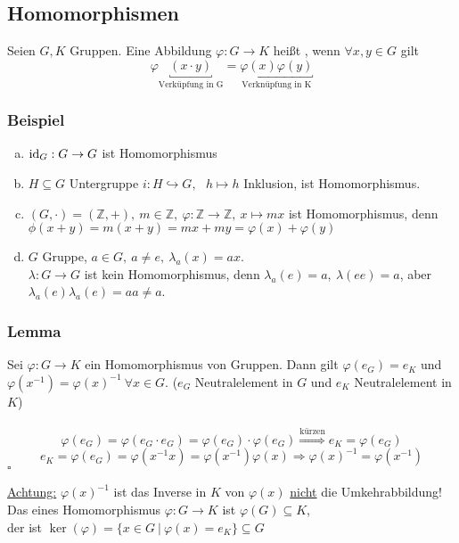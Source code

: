 \subsection{Homomorphismen}
\label{sub:homomorphismen}
Seien $G,K$ Gruppen. 
Eine Abbildung $\varphi: G \to K$ heißt , wenn $\forall x,y \in G$ gilt
\[
\varphi\underbracket{(x\cdot y)}_{\text{Verküpfung in G} } =\underbracket{\varphi(x)\varphi(y)}_{\text{Verknüpfung in K}} 
\]

\subsubsection*{Beispiel}
\begin{enumerate}[(a)]
	\item $\operatorname{id}_G: G \to G$ ist Homomorphismus
	\item $H \subseteq G$ Untergruppe   $i:H \hookrightarrow G,~~~h \mapsto h$ Inklusion, ist Homomorphismus.
	\item $(G,\cdot)=(\mathds{Z},+),~ m\in \mathds{Z},~ \varphi:\mathds{Z} \to \mathds{Z},~ x\mapsto mx$ ist Homomorphismus, denn $\phi(x+y)=m(x+y)=mx+my=\varphi(x)+\varphi(y)$
	\item $G$ Gruppe, $a \in G,~ a\not= e,~ \lambda_a(x)=ax$.\\
	$\lambda: G \to G$ ist kein Homomorphismus, denn $\lambda_a(e)=a,~ \lambda(ee)=a$, aber $\lambda_a(e)\lambda_a(e)=aa\not=a$.
\end{enumerate}

\subsubsection*{Lemma}
Sei $\varphi:G \to K$ ein Homomorphismus von Gruppen. 
Dann gilt $\varphi(e_G)=e_K$ und $\varphi(x^{-1})=\varphi(x)^{-1}~\forall x \in G$. 
($e_G$ Neutralelement in $G$ und $e_K$ Neutralelement in $K$)\\
\\
\[	
\varphi(e_G)=\varphi(e_G \cdot e_G)=\varphi(e_G) \cdot \varphi(e_G) \stackrel{\text{kürzen}}{\Rightarrow} e_K=\varphi(e_G)
\]
\[
e_K=\varphi(e_G)=\varphi(x^{-1}x)=\varphi(x^{-1})\varphi(x) \Rightarrow \varphi(x)^{-1}=\varphi(x^{-1})
\]
\hfill $\square$

\uline{Achtung:} $\varphi(x)^{-1}$ ist das Inverse in $K$ von $\varphi(x)$ \uline{nicht} die Umkehrabbildung!\\

Das  eines Homomorphismus $\varphi:G \to K$ ist $\varphi(G)\subseteq K$,\\
der  ist $\ker(\varphi)=\{x \in G~|~\varphi(x)=e_K \}\subseteq G$

